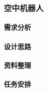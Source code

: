 \subsubsection{空中机器人}

    \paragraph{需求分析}
    
    \paragraph{设计思路}
    
    \paragraph{资料整理}
    
    \paragraph{任务安排}
    